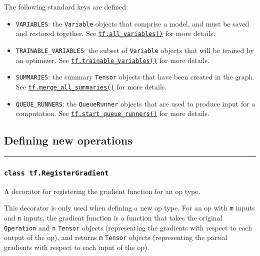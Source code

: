 The following standard keys are defined:

\begin{itemize}
\tightlist
\item
  \lstinline{VARIABLES}: the \lstinline{Variable} objects that comprise a
  model, and must be saved and restored together. See
  \href{../../api_docs/python/state_ops.md\#all_variables}{\lstinline{tf.all_variables()}}
  for more details.
\item
  \lstinline{TRAINABLE_VARIABLES}: the subset of \lstinline{Variable} objects
  that will be trained by an optimizer. See
  \href{../../api_docs/python/state_ops.md\#trainable_variables}{\lstinline{tf.trainable_variables()}}
  for more details.
\item
  \lstinline{SUMMARIES}: the summary \lstinline{Tensor} objects that have been
  created in the graph. See
  \href{../../api_docs/python/train.md\#merge_all_summaries}{\lstinline{tf.merge_all_summaries()}}
  for more details.
\item
  \lstinline{QUEUE_RUNNERS}: the \lstinline{QueueRunner} objects that are
  used to produce input for a computation. See
  \href{../../api_docs/python/train.md\#start_queue_runners}{\lstinline{tf.start_queue_runners()}}
  for more details.
\end{itemize}

\subsection{Defining new operations }\label{defining-new-operations}

\begin{center}\rule{0.5\linewidth}{\linethickness}\end{center}

\subsubsection{\texorpdfstring{\lstinline{class tf.RegisterGradient}
}{class tf.RegisterGradient }}\label{class-tf.registergradient}

A decorator for registering the gradient function for an op type.

This decorator is only used when defining a new op type. For an op with
\lstinline{m} inputs and \lstinline{n} inputs, the gradient function is a
function that takes the original \lstinline{Operation} and \lstinline{n}
\lstinline{Tensor} objects (representing the gradients with respect to each
output of the op), and returns \lstinline{m} \lstinline{Tensor} objects
(representing the partial gradients with respect to each input of the
op).

